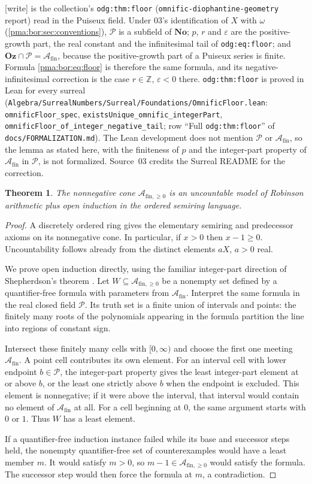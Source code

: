 \documentclass[11pt]{article}
\numberwithin{equation}{section}
\newtheorem{theorem}{Theorem}[section]
\theoremstyle{definition}
\theoremstyle{remark}
\newcommand{\Z}{\mathbb Z}
\newcommand{\No}{\mathbf{No}}
\newcommand{\Oz}{\mathbf{Oz}}
\newcommand{\Pui}{\mathcal P}
\newcommand{\A}{\mathcal A_{\mathrm{fin}}}
\newcommand{\PP}{\mathcal A_{\mathrm{fin},\geq 0}}
\newcommand{\writetag}{\textup{\textsf{\small[write]}}}
\newcommand{\replabel}[1]{\nolinkurl{#1}}
\newcommand{\fn}[1]{\nolinkurl{#1}}
\begin{document}
\noindent\writetag{}  is the collection's
\replabel{odg:thm:floor} (\fn{omnific-diophantine-geometry} report) read in
the Puiseux field. Under 03's identification of $X$ with $\omega$
(\cref{pma:bor:sec:conventions}), $\Pui$ is a subfield of $\No$; $p$, $r$ and
$\varepsilon$ are the positive-growth part, the real constant and the
infinitesimal tail of \replabel{odg:eq:floor}; and $\Oz\cap\Pui=\A$, because
the positive-growth part of a Puiseux series is finite. Formula
\eqref{pma:bor:eq:floor} is therefore the same formula, and its
negative-infinitesimal correction is the case $r\in\Z$, $\varepsilon<0$ there.
\replabel{odg:thm:floor} is proved in Lean for every surreal
(\fn{Algebra/SurrealNumbers/Surreal/Foundations/OmnificFloor.lean}:
\texttt{omnificFloor\_spec}, \texttt{existsUnique\_omnific\_integerPart},
\texttt{omnificFloor\_of\_integer\_negative\_tail}; row ``Full
\texttt{odg:thm:floor}'' of \fn{docs/FORMALIZATION.md}). The Lean development
does not mention $\Pui$ or $\A$, so the lemma as stated here, with the
finiteness of $p$ and the integer-part property of $\A$ in $\Pui$, is not
formalized. Source~03 credits the Surreal README for the correction.

\begin{theorem}
\label{pma:bor:thm:arithmetic}
The nonnegative cone $\PP$ is an uncountable model of Robinson arithmetic
plus open induction in the ordered semiring language.
\end{theorem}
\begin{proof}
A discretely ordered ring gives the elementary semiring and predecessor
axioms on its nonnegative cone. In particular, if $x>0$ then $x-1\geq0$.
Uncountability follows already from the distinct elements $aX$, $a>0$ real.

We prove open induction directly, using the familiar integer-part direction
of Shepherdson's theorem \cite{Shepherdson,Glivicky}. Let $W\subseteq\PP$ be
a nonempty set defined by a quantifier-free formula with parameters from
$\A$. Interpret the same formula in the real closed field $\Pui$. Its truth
set is a finite union of intervals and points: the finitely many roots of the
polynomials appearing in the formula partition the line into regions of
constant sign.

Intersect these finitely many cells with $[0,\infty)$ and choose the first
one meeting $\A$. A point cell contributes its own element. For an interval
cell with lower endpoint $b\in\Pui$, the integer-part property gives the least
integer-part element at or above $b$, or the least one strictly above $b$
when the endpoint is excluded. This element is nonnegative; if it were above
the interval, that interval would contain no element of $\A$ at all.
For a cell beginning at $0$, the same argument starts with $0$ or $1$.
Thus $W$ has a least element.

If a quantifier-free induction instance failed while its base and successor
steps held, the nonempty quantifier-free set of counterexamples would have a
least member $m$. It would satisfy $m>0$, so $m-1\in\PP$ would satisfy the
formula. The successor step would then force the formula at $m$, a
contradiction.
\end{proof}
\end{document}
